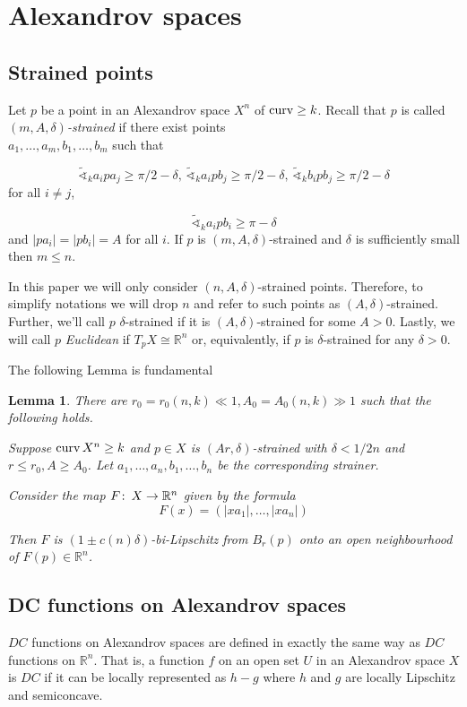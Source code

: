\documentclass[12pt,leqno]{amsart}
\numberwithin{equation}{section}
\newtheorem{lem}[thm]{Lemma}
\theoremstyle{definition}
\theoremstyle{remark}
\newcommand{\R}{\mathbb{R}}
\def\co{\colon\thinspace}
\newcommand{\curv}{\mathop{\rm curv}}
\begin{document}
\section{Alexandrov spaces}


\subsection{Strained points}
Let $p$ be a point in an  Alexandrov space $X^n$ of $\curv\ge k$. Recall that $p$ is called \emph{$(m,A,\delta)$-strained} if there exist points\\ $a_1,\ldots, a_m, b_1,\ldots, b_m$ such that

\[
\tilde\sphericalangle_ka_ipa_j\ge \pi/2-\delta,\,\tilde\sphericalangle_ka_ipb_j\ge \pi/2-\delta,\, \tilde\sphericalangle_kb_ipb_j\ge \pi/2-\delta
\]
for all $i\ne j$,

\[
\tilde\sphericalangle_ka_ipb_i\ge \pi-\delta
\]
and $|pa_i|=|pb_i|=A$ for all $i$. If $p$ is $(m,A,\delta)$-strained and $\delta$ is sufficiently small then $m\le n$.

In this paper we will only consider $(n,A,\delta)$-strained  points. Therefore, to simplify notations we will drop $n$ and refer to such points as $(A,\delta)$-strained. Further, we'll call $p$ $\delta$-strained if it is $(A,\delta)$-strained for some $A>0$. Lastly, we will call $p$ \emph{Euclidean} if $T_pX\cong \R^n$ or, equivalently, if $p$ is $\delta$-strained for any $\delta>0$.

The following Lemma is fundamental

\begin{lem}\label{lem-strainer-map}\cite{BGP}
There are $r_0=r_0(n,k)\ll 1, A_0=A_0(n,k)\gg 1$ such that the following holds.

Suppose $\curv X^n\ge k$ and  $p\in X$ is  $(Ar,\delta)$-strained with $\delta<1/2n$ and  $r\le r_0, A\ge A_0$. Let  $a_1,\ldots, a_n, b_1,\ldots, b_n$ be the corresponding strainer.

Consider the map $F\co X\to\R^n$ given by the formula
\[
F(x)=(|xa_1|,\ldots, |xa_n|)
\]

Then $F$ is $(1\pm c(n) \delta)$-bi-Lipschitz from $B_r(p)$ onto an open neighbourhood of $F(p)\in \R^n$.

\end{lem}










\subsection{DC functions on Alexandrov spaces}
$DC$ functions on Alexandrov spaces are defined in exactly the same way as $DC$ functions on $\R^n$. That is, a function $f$ on an open set $U$ in an Alexandrov space $X$ is $DC$ if  it can be locally represented as  $h-g$ where $h$ and $g$ are locally Lipschitz and semiconcave.
\end{document}
